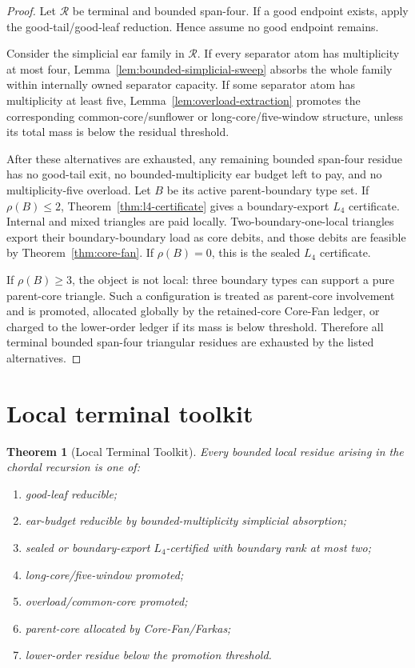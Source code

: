 \documentclass[11pt]{article}
\newtheorem{theorem}{Theorem}[section]
\theoremstyle{definition}
\newcommand{\calR}{\mathcal R}
\begin{document}
\begin{proof}
Let \(\calR\) be terminal and bounded span-four. If a good endpoint exists, apply the good-tail/good-leaf reduction. Hence assume no good endpoint remains.

Consider the simplicial ear family in \(\calR\). If every separator atom has multiplicity at most four, Lemma~\ref{lem:bounded-simplicial-sweep} absorbs the whole family within internally owned separator capacity. If some separator atom has multiplicity at least five, Lemma~\ref{lem:overload-extraction} promotes the corresponding common-core/sunflower or long-core/five-window structure, unless its total mass is below the residual threshold.

After these alternatives are exhausted, any remaining bounded span-four residue has no good-tail exit, no bounded-multiplicity ear budget left to pay, and no multiplicity-five overload. Let \(B\) be its active parent-boundary type set. If \(\rho(B)\le2\), Theorem~\ref{thm:l4-certificate} gives a boundary-export \(L_4\) certificate. Internal and mixed triangles are paid locally. Two-boundary-one-local triangles export their boundary-boundary load as core debits, and those debits are feasible by Theorem~\ref{thm:core-fan}. If \(\rho(B)=0\), this is the sealed \(L_4\) certificate.

If \(\rho(B)\ge3\), the object is not local: three boundary types can support a pure parent-core triangle. Such a configuration is treated as parent-core involvement and is promoted, allocated globally by the retained-core Core-Fan ledger, or charged to the lower-order ledger if its mass is below threshold. Therefore all terminal bounded span-four triangular residues are exhausted by the listed alternatives.
\end{proof}

\section{Local terminal toolkit}

\begin{theorem}[Local Terminal Toolkit]
\label{thm:local-toolkit}
Every bounded local residue arising in the chordal recursion is one of:
\begin{enumerate}[label=(\roman*)]
    \item good-leaf reducible;
    \item ear-budget reducible by bounded-multiplicity simplicial absorption;
    \item sealed or boundary-export \(L_4\)-certified with boundary rank at most two;
    \item long-core/five-window promoted;
    \item overload/common-core promoted;
    \item parent-core allocated by Core-Fan/Farkas;
    \item lower-order residue below the promotion threshold.
\end{enumerate}
\end{theorem}
\end{document}
